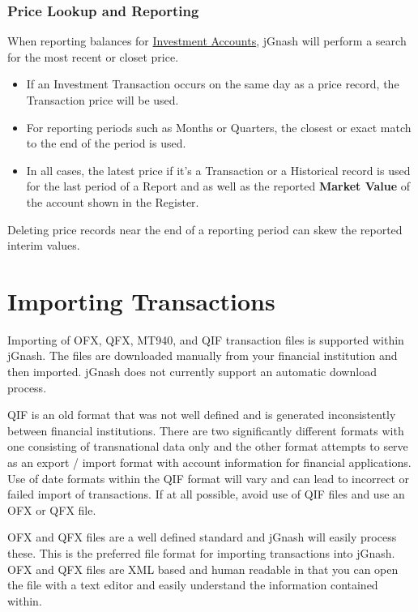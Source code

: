 \documentclass[letterpaper,12pt]{book}
\begin{document}
    \subsection{Price Lookup and Reporting}
    \label{sec:pricelookup}
           
    When reporting balances for \hyperref[sub:investaccount]{Investment Accounts}, jGnash will perform a search
    for the most recent or closet price.
        
    \begin{itemize}
        \item If an Investment Transaction occurs on the same day as a price record, the Transaction price will be used.
        \item For reporting periods such as Months or Quarters, the closest or exact match to the end of the period is used.
        \item  In all cases, the latest price if it's a Transaction or a Historical record is used for the last period 
        of a Report and as well as the reported \textbf{Market Value} of the account shown in the Register.      
    \end{itemize}
      
    Deleting price records near the end of a reporting period can skew the reported interim values.

    \chapter{Importing Transactions}
    Importing of OFX, QFX, MT940, and QIF transaction files is supported within jGnash.
    The files are downloaded manually from your financial institution and then imported.
    jGnash does not currently support an automatic download process.

    QIF is an old format that was not well defined and is generated inconsistently between financial institutions.
    There are two significantly different formats with one consisting of transnational data only and the other format
    attempts to serve as an export / import format with account information for financial applications.
    Use of date formats within the QIF format will vary and can lead to incorrect or failed import of transactions.
    If at all possible, avoid use of QIF files and use an OFX or QFX file.

    OFX and QFX files are a well defined standard and jGnash will easily process these.
    This is the preferred file format for importing transactions into jGnash.
    OFX and QFX files are XML based and human readable in that you can open the file
    with a text editor and easily understand the information contained within.
\end{document}

